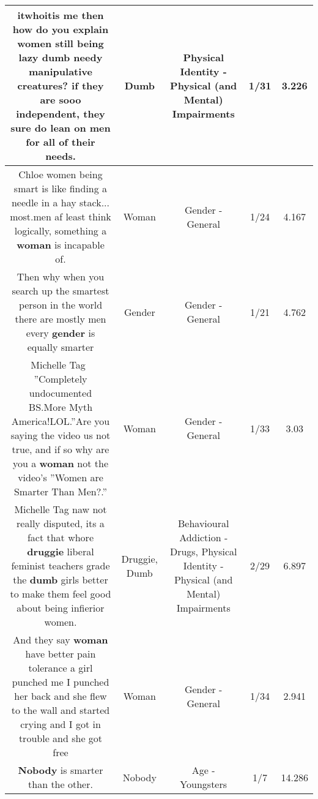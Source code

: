 \documentclass[11pt]{article}
\newlength\mylength
\begin{document}
\begin{center}
\begin{longtable}{|C{.65\mylength}|C{.30\mylength}|C{.12\mylength}|C{.12\mylength}|C{.12\mylength}|}
  \small itwhoitis me then how do you explain women still being lazy \textbf{dumb} needy manipulative creatures? if they are sooo independent, they sure do lean on men for all of their needs.\normalsize   & Dumb & Physical Identity - Physical (and Mental) Impairments & 1/31 & 3.226 \\  \hline
  \small Chloe women being smart is like finding a needle in a hay stack... most.men af least think logically, something a \textbf{woman} is incapable of.\normalsize   & Woman & Gender - General & 1/24 & 4.167 \\  \hline
  \small Then why when you search up the smartest person in the world there are mostly men    every \textbf{gender} is equally smarter\normalsize   & Gender & Gender - General & 1/21 & 4.762 \\  \hline
  \small Michelle Tag  ''Completely undocumented BS.More Myth America!LOL.''Are you saying the video us not true, and if so why are you a \textbf{woman} not the video's ''Women are Smarter Than Men?.''\normalsize   & Woman & Gender - General & 1/33 & 3.03 \\  \hline
  \small Michelle Tag naw not really disputed, its a fact that whore \textbf{druggie} liberal feminist teachers grade the \textbf{dumb} girls better to make them feel good about being infierior women.\normalsize   & Druggie, Dumb & Behavioural Addiction - Drugs, Physical Identity - Physical (and Mental) Impairments & 2/29 & 6.897 \\  \hline
  \small And they say \textbf{woman} have better pain tolerance a girl punched me I punched her back and she flew to the wall and started crying and I got in trouble and she got free\normalsize   & Woman & Gender - General & 1/34 & 2.941 \\  \hline
  \small   \textbf{Nobody} is smarter than the other.\normalsize   & Nobody & Age - Youngsters & 1/7 & 14.286 \\  \hline

\end{longtable}
\end{center}
\end{document}
